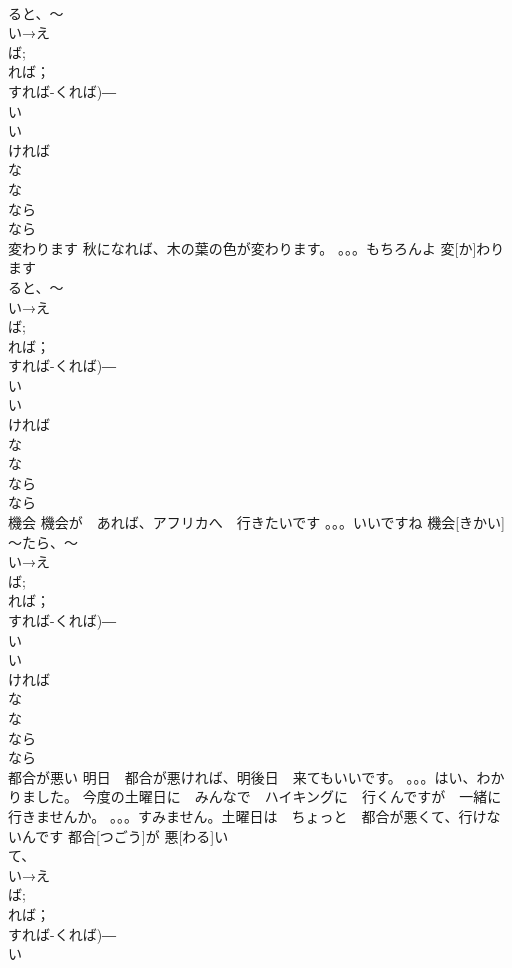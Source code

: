 \documentclass[8pt]{extreport}
\begin{document}
\begin{CJK}{UTF8}{min}
\\	ると、～	
\\	い→え
\\	ば;
\\	れば；
\\	すれば-くれば)―　
\\	い
\\	い　
\\	ければ　
\\	な 
\\	な
\\	なら　
\\	なら
\\	変わります	秋になれば、木の葉の色が変わります。 。。。もちろんよ	変[か]わります			
\\	ると、～	
\\	い→え
\\	ば;
\\	れば；
\\	すれば-くれば)―　
\\	い
\\	い　
\\	ければ　
\\	な 
\\	な
\\	なら　
\\	なら
\\	機会	機会が　あれば、アフリカへ　行きたいです 。。。いいですね	機会[きかい]			
\\	～たら、～
\\	い→え
\\	ば;
\\	れば；
\\	すれば-くれば)―　
\\	い
\\	い　
\\	ければ　
\\	な 
\\	な
\\	なら　
\\	なら
\\	都合が悪い	明日　都合が悪ければ、明後日　来てもいいです。 。。。はい、わかりました。 今度の土曜日に　みんなで　ハイキングに　行くんですが　一緒に　行きませんか。 。。。すみません。土曜日は　ちょっと　都合が悪くて、行けないんです	都合[つごう]が 悪[わる]い			
\\	て、
\\	い→え
\\	ば;
\\	れば；
\\	すれば-くれば)―　
\\	い

\end{CJK}
\end{document}
